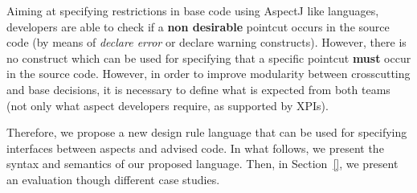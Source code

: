Aiming at specifying restrictions in base code using AspectJ like languages,
developers are able to check if a {\bf non desirable} pointcut occurs in the
source code (by means of \emph{declare error} or {declare warning} constructs).
However, there is no construct which can be used for specifying that a specific
pointcut {\bf must} occur in the source code. However, in order to improve
modularity between crosscutting and base decisions, it is necessary to define
what is expected from both teams (not only what aspect developers require, as
supported by XPIs).


Therefore, we propose a new design rule language that can be used for specifying
interfaces between aspects and advised code. In what follows, we present the
syntax and semantics of our proposed language. Then, in Section~\ref{}, we
present an evaluation though different case studies.



